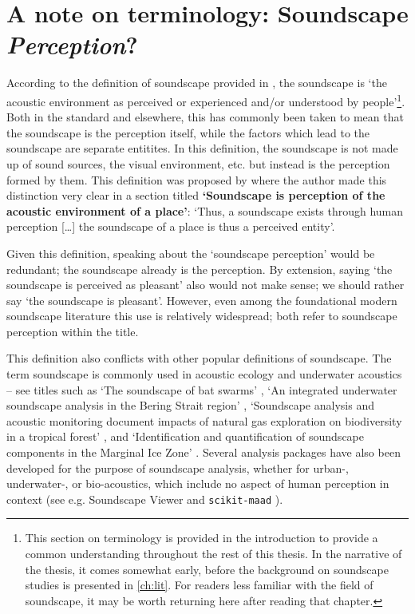 \newpage


\section{A note on terminology: Soundscape \emph{Perception}?}
\label{sec:terminology}

According to the definition of soundscape provided in \citet{ISO12913Part1}, the soundscape is `the acoustic environment as perceived or experienced and/or understood by people'\footnote{This section on terminology is provided in the introduction to provide a common understanding throughout the rest of this thesis. In the narrative of the thesis, it comes somewhat early, before the background on soundscape studies is presented in \cref{ch:lit}. For readers less familiar with the field of soundscape, it may be worth returning here after reading that chapter.}. Both in the standard and elsewhere, this has commonly been taken to mean that the soundscape is the perception itself, while the factors which lead to the soundscape are separate entitites. In this definition, the soundscape is not made up of sound sources, the visual environment, etc. but instead is the perception formed by them. This definition was proposed by \citet{Brown2012review} where the author made this distinction very clear in a section titled \textbf{`Soundscape is perception of the acoustic environment of a place'}: `Thus, a soundscape exists through human perception [\ldots] the soundscape of a place is thus a perceived entity'.

Given this definition, speaking about the `soundscape perception' would be redundant; the soundscape already is the perception. By extension, saying `the soundscape is perceived as pleasant' also would not make sense; we should rather say `the soundscape is pleasant'. However, even among the foundational modern soundscape literature this use is relatively widespread; \citet{Axelsson2010principal,Liu2014Effects} both refer to soundscape perception within the title. 

This definition also conflicts with other popular definitions of soundscape. The term soundscape is commonly used in acoustic ecology and underwater acoustics -- see titles such as `The soundscape of bat swarms' \citep{Kloepper2017soundscape}, `An integrated underwater soundscape analysis in the Bering Strait region' \citep{McKenna2021integrated}, `Soundscape analysis and acoustic monitoring document impacts of natural gas exploration on biodiversity in a tropical forest' \citep{Deichmann2017Soundscape}, and `Identification and quantification of soundscape components in the Marginal Ice Zone' \citep{Geyer2016Identification}. Several analysis packages have also been developed for the purpose of soundscape analysis, whether for urban-, underwater-, or bio-acoustics, which include no aspect of human perception in context (see e.g. Soundscape Viewer \citep{Sun2020Soundscape} and \texttt{scikit-maad} \citep{Ulloa2021scikit}). 

